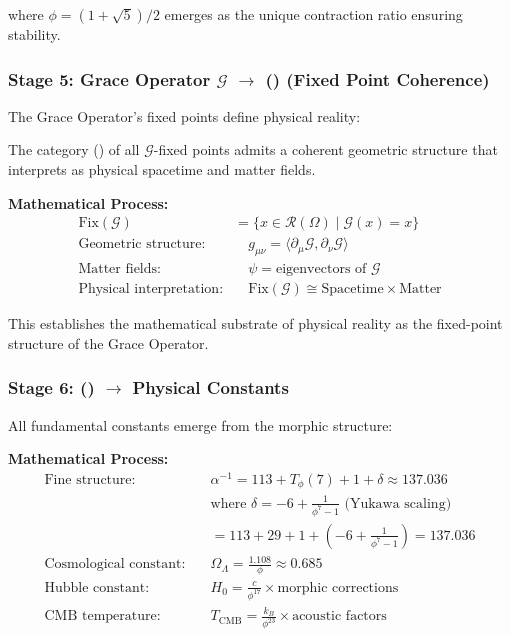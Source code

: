 where $\phi = (1+\sqrt{5})/2$ emerges as the unique contraction ratio ensuring stability.

\subsubsection{Stage 5: Grace Operator $\mathcal{G}$ $\rightarrow$ () (Fixed Point Coherence)}

The Grace Operator's fixed points define physical reality:

\begin{axiom}
The category () of all $\mathcal{G}$-fixed points admits a coherent geometric structure that interprets as physical spacetime and matter fields.
\end{axiom}

\textbf{Mathematical Process:}
\begin{align}
\text{Fix}(\mathcal{G}) &= \{x \in \mathcal{R}(\Omega) \mid \mathcal{G}(x) = x\}\\
\text{Geometric structure:} &\quad g_{\mu\nu} = \langle \partial_\mu \mathcal{G}, \partial_\nu \mathcal{G} \rangle\\
\text{Matter fields:} &\quad \psi = \text{eigenvectors of } \mathcal{G}\\
\text{Physical interpretation:} &\quad \text{Fix}(\mathcal{G}) \cong \text{Spacetime} \times \text{Matter}
\end{align}

This establishes the mathematical substrate of physical reality as the fixed-point structure of the Grace Operator.

\subsubsection{Stage 6: () $\rightarrow$ Physical Constants}

All fundamental constants emerge from the morphic structure:

\textbf{Mathematical Process:}
\begin{align}
\text{Fine structure:} &\quad \alpha^{-1} = 113 + T_\phi(7) + 1 + \delta \approx 137.036\\
&\quad \text{where } \delta = -6 + \frac{1}{\phi^7 - 1} \text{ (Yukawa scaling)}\\
&\quad = 113 + 29 + 1 + (-6 + \frac{1}{\phi^7 - 1}) = 137.036\\
\text{Cosmological constant:} &\quad \Omega_\Lambda = \frac{1.108}{\phi} \approx 0.685\\
\text{Hubble constant:} &\quad H_0 = \frac{c}{\phi^{17}} \times \text{morphic corrections}\\
\text{CMB temperature:} &\quad T_{\text{CMB}} = \frac{k_B}{\phi^{23}} \times \text{acoustic factors}
\end{align}

